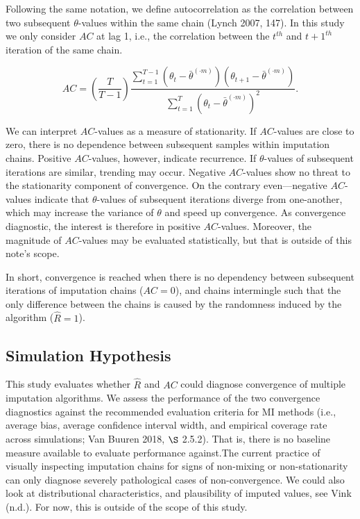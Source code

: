 \documentclass[
  Royal, times, sageapa]{sagej}
\begin{document}
Following the same notation, we define autocorrelation as the
correlation between two subsequent \(\theta\)-values within the same
chain (Lynch 2007, 147). In this study we only consider \(AC\) at lag 1,
i.e., the correlation between the \(t^{th}\) and \(t+1^{th}\) iteration
of the same chain.

\begin{equation*}
AC = \left( \frac{T}{T-1} \right) \frac{\sum_{t=1}^{T-1}(\theta_t - \bar{\theta}^{(\cdot m)})(\theta_{t+1} - \bar{\theta}^{(\cdot m)})}{\sum_{t=1}^{T}(\theta_t - \bar{\theta}^{(\cdot m)})^2}.
\end{equation*}

We can interpret \(AC\)-values as a measure of stationarity. If
\(AC\)-values are close to zero, there is no dependence between
subsequent samples within imputation chains. Positive \(AC\)-values,
however, indicate recurrence. If \(\theta\)-values of subsequent
iterations are similar, trending may occur. Negative \(AC\)-values show
no threat to the stationarity component of convergence. On the contrary
even---negative \(AC\)-values indicate that \(\theta\)-values of
subsequent iterations diverge from one-another, which may increase the
variance of \(\theta\) and speed up convergence. As convergence
diagnostic, the interest is therefore in positive \(AC\)-values.
Moreover, the magnitude of \(AC\)-values may be evaluated statistically,
but that is outside of this note's scope.

In short, convergence is reached when there is no dependency between
subsequent iterations of imputation chains (\(AC = 0\)), and chains
intermingle such that the only difference between the chains is caused
by the randomness induced by the algorithm (\(\widehat{R} = 1\)).

\hypertarget{simulation-hypothesis}{%
\subsection{Simulation Hypothesis}\label{simulation-hypothesis}}

This study evaluates whether \(\widehat{R}\) and \(AC\) could diagnose
convergence of multiple imputation algorithms. We assess the performance
of the two convergence diagnostics against the recommended evaluation
criteria for MI methods (i.e., average bias, average confidence interval
width, and empirical coverage rate across simulations; Van Buuren 2018,
\(\S\) 2.5.2). That is, there is no baseline measure available to
evaluate performance against.The current practice of visually inspecting
imputation chains for signs of non-mixing or non-stationarity can only
diagnose severely pathological cases of non-convergence. We could also
look at distributional characteristics, and plausibility of imputed
values, see Vink (n.d.). For now, this is outside of the scope of this
study.
\end{document}
